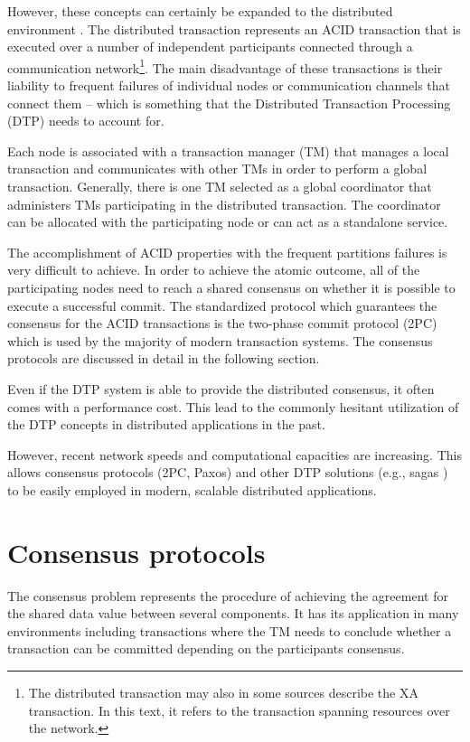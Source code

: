 \documentclass[oneside,
  digital, %
  table,   %
  lof,     %
  lot,     %
]{fithesis3}
\begin{document}
However, these concepts can certainly be expanded to the distributed environment \cite{java_tran_processing}. The distributed transaction represents an ACID transaction that is executed over a number of independent participants connected through a communication network\footnote{The distributed transaction may also in some sources describe the XA transaction. In this text, it refers to the transaction spanning resources over the network.}. The main disadvantage of these transactions is their liability to frequent failures of individual nodes or communication channels that connect them -- which is something that the Distributed Transaction Processing (DTP) needs to account for. 

Each node is associated with a transaction manager (TM) that manages a local transaction and communicates with other TMs in order to perform a global transaction. Generally, there is one TM selected as a global coordinator that administers TMs participating in the distributed transaction. The coordinator can be allocated with the participating node or can act as a standalone service.

The accomplishment of ACID properties with the frequent partitions failures is very difficult to achieve. In order to achieve the atomic outcome, all of the participating nodes need to reach a shared consensus on whether it is possible to execute a successful commit. The standardized protocol which guarantees the consensus for the ACID transactions is the two-phase commit protocol (2PC) which is used by the majority of modern transaction systems. The consensus protocols are discussed in detail in the following section.

Even if the DTP system is able to provide the distributed consensus, it often comes with a performance cost. This lead to the commonly hesitant utilization of the DTP concepts in distributed applications in the past. 

However, recent network speeds and computational capacities are increasing. This allows consensus protocols (2PC, Paxos) and other DTP solutions (e.g., sagas \cite{sagas_publ}) to be easily employed in modern, scalable distributed applications.



\section{Consensus protocols}
\label{sec:consensus-protocols}

The consensus problem represents the procedure of achieving the agreement for the shared data value between several components. It has its application in many environments including transactions where the TM needs to conclude whether a transaction can be committed depending on the participants consensus.
\end{document}
